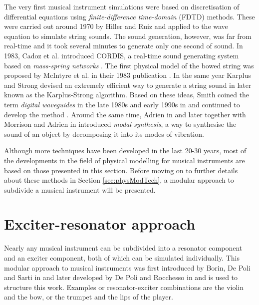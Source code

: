 The very first musical instrument simulations were based on discretisation of differential equations using \textit{finite-difference time-domain} (FDTD) methods. These were carried out around 1970 by Hiller and Ruiz \cite{Ruiz1969, Hiller1971I, Hiller1971II} and applied to the wave equation to simulate string sounds. The sound generation, however, was far from real-time and it took several minutes to generate only one second of sound. In 1983, Cadoz et al. introduced CORDIS, a real-time sound generating system based on \textit{mass-spring networks} \cite{Cadoz1983}.
The first physical model of the bowed string was proposed by McIntyre et al. in their 1983 publication \cite{McIntyre1983}. In the same year Karplus and Strong devised an extremely efficient way to generate a string sound in \cite{Karplus1983} later known as the Karplus-Strong algorithm. Based on these ideas, Smith coined the term \textit{digital waveguides} in the late 1980s and early 1990s in \cite{Smith1987, Smith1992} and continued to develop the method \cite{Smith2010b}.
Around the same time, Adrien in \cite{Adrien1991} and later together with Morrison and Adrien in \cite{Morrison1993} introduced \textit{modal synthesis}, a way to synthesise the sound of an object by decomposing it into its modes of vibration. 

Although more techniques have been developed in the last 20-30 years, most of the developments in the field of physical modelling for musical instruments are based on those presented in this section. Before moving on to further details about these methods in Section \ref{sec:physModTech}, a modular approach to subdivide a musical instrument will be presented.

\section{Exciter-resonator approach}\label{sec:exciterResonator}
Nearly any musical instrument can be subdivided into a resonator component and an exciter component, both of which can be simulated individually. This modular approach to musical instruments was first introduced by Borin, De Poli and Sarti in \cite{Borin1989} and later developed by De Poli and Rocchesso in \cite{Poli1998} and is used to structure this work. Examples or resonator-exciter combinations are the violin and the bow, or the trumpet and the lips of the player. %

